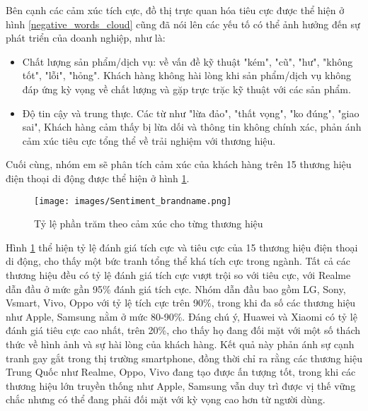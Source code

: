Bên cạnh các cảm xúc tích cực, đồ thị trực quan hóa tiêu cực được thể hiện ở hình \ref{negative_words_cloud} cũng đã nói lên các yếu tố có thể ảnh hưởng đến sự phát triển của doanh nghiệp, như là:

\begin{itemize}
    \item Chất lượng sản phẩm/dịch vụ: về vấn đề kỹ thuật "kém", "cũ", "hư", "không tốt", "lỗi", "hỏng". Khách hàng không hài lòng khi sản phẩm/dịch vụ không đáp ứng kỳ vọng về chất lượng và gặp trực trặc kỹ thuật với các sản phẩm.
    \item Độ tin cậy và trung thực. Các từ như "lừa đảo", "thất vọng", "ko đúng", "giao sai", Khách hàng cảm thấy bị lừa dối và thông tin không chính xác, phản ánh cảm xúc tiêu cực tổng thể về trải nghiệm với thương hiệu.
\end{itemize}

Cuối cùng, nhóm em sẽ phân tích cảm xúc của khách hàng trên 15 thương hiệu điện thoại di động được thể hiện ở hình \ref{Sentiment_brandname}.

\begin{center}
    \begin{figure}[htp] %
        \centering
        \texttt{[image: images/Sentiment\_brandname.png]}
        \caption{Tỷ lệ phần trăm theo cảm xúc cho từng thương hiệu}
        \label{Sentiment_brandname}
    \end{figure}
\end{center}

Hình \ref{Sentiment_brandname} thể hiện tỷ lệ đánh giá tích cực và tiêu cực của 15 thương hiệu điện thoại di động, cho thấy một bức tranh tổng thể khá tích cực trong ngành. Tất cả các thương hiệu đều có tỷ lệ đánh giá tích cực vượt trội so với tiêu cực, với Realme dẫn đầu ở mức gần 95\% đánh giá tích cực. Nhóm dẫn đầu bao gồm  LG, Sony, Vsmart, Vivo, Oppo với tỷ lệ tích cực trên 90\%, trong khi đa số các thương hiệu như Apple, Samsung nằm ở mức 80-90\%. Đáng chú ý, Huawei và Xiaomi có tỷ lệ đánh giá tiêu cực cao nhất, trên 20\%, cho thấy họ đang đối mặt với một số thách thức về hình ảnh và sự hài lòng của khách hàng. Kết quả này phản ánh sự cạnh tranh gay gắt trong thị trường smartphone, đồng thời chỉ ra rằng các thương hiệu Trung Quốc như Realme, Oppo, Vivo đang tạo được ấn tượng tốt, trong khi các thương hiệu lớn truyền thống như Apple, Samsung vẫn duy trì được vị thế vững chắc nhưng có thể đang phải đối mặt với kỳ vọng cao hơn từ người dùng.
